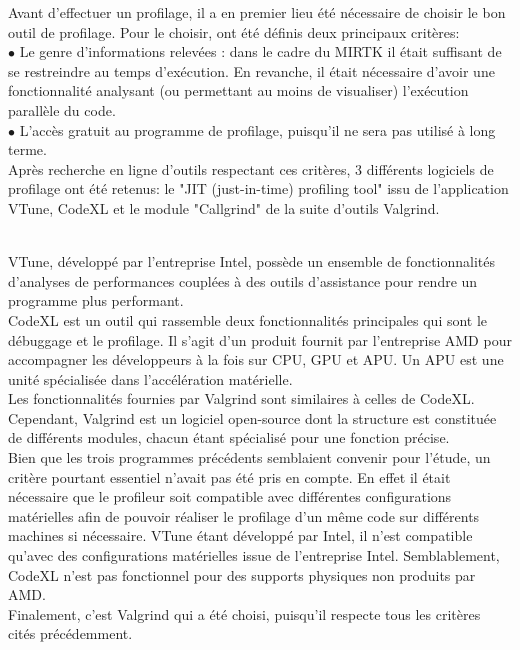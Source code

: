 \documentclass[10pt]{report}
\begin{document}
Avant d'effectuer un profilage, il a en premier lieu été nécessaire de choisir le bon outil de profilage. Pour le choisir, ont été définis deux principaux critères:\\
{$\bullet$} Le genre d'informations relevées : dans le cadre du MIRTK il était suffisant de se restreindre au temps d'exécution. En revanche, il était nécessaire d'avoir une fonctionnalité analysant (ou permettant au moins de visualiser) l'exécution parallèle du code. \\
{$\bullet$} L'accès gratuit au programme de profilage, puisqu'il ne sera pas utilisé à long terme.\\
Après recherche en ligne d'outils respectant ces critères, 3 différents logiciels de profilage ont été retenus: le "JIT (just-in-time) profiling tool" issu de l'application VTune, CodeXL et le module "Callgrind" de la suite d'outils Valgrind.\\~\par
\noindent VTune, développé par l'entreprise Intel, possède un ensemble de fonctionnalités d'analyses de performances couplées à des outils d'assistance pour rendre un programme plus performant. \\
CodeXL est un outil qui rassemble deux fonctionnalités principales qui sont le débuggage et le profilage. Il s'agit d'un produit fournit par l'entreprise AMD pour accompagner les développeurs à la fois sur CPU, GPU et APU. Un APU est une unité spécialisée dans l'accélération matérielle.
\\Les fonctionnalités fournies par Valgrind sont similaires à celles de CodeXL. Cependant, Valgrind est un logiciel open-source dont la structure est constituée de différents modules, chacun étant spécialisé pour une fonction précise.\\

Bien que les trois programmes précédents semblaient convenir pour l'étude, un critère pourtant essentiel n'avait pas été pris en compte. En effet il était nécessaire que le profileur soit compatible avec différentes configurations matérielles afin de pouvoir réaliser le profilage d'un même code sur différents machines si nécessaire. VTune étant développé par Intel, il n'est compatible qu'avec des configurations matérielles issue de l'entreprise Intel. Semblablement, CodeXL n'est pas fonctionnel pour des supports physiques non produits par AMD.\\

Finalement, c'est Valgrind qui a été choisi, puisqu'il respecte tous les critères cités précédemment.
 \\
 
\end{document}

